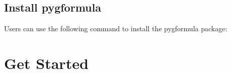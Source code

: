 \documentclass[letterpaper,10pt,english]{sphinxmanual}
\begin{document}
\section{Install pygformula}
\label{\detokenize{Installation:install-pygformula}}
\sphinxAtStartPar
Users can use the following command to install the pygformula package:

\begin{sphinxVerbatim}[commandchars=\\\{\}]
  
\end{sphinxVerbatim}


\chapter{Get Started}
\label{\detokenize{Get Started:get-started}}\label{\detokenize{Get Started::doc}}
\end{document}
